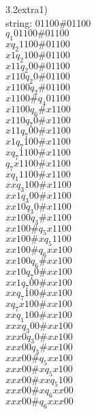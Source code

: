 \documentclass[11pt]{article}
\begin{document}
\noindent3.2extra1)\\
string: 01100\#01100\\
$q_1 0 1 1 0 0 \# 0 1 1 0 0$\\
$x q_2 1 1 0 0 \# 0 1 1 0 0$\\
$x 1 q_2 1 0 0 \# 0 1 1 0 0$\\
$x 1 1 q_2 0 0 \# 0 1 1 0 0$\\
$x 1 1 0 q_2 0 \# 0 1 1 0 0$\\
$x 1 1 0 0 q_2 \# 0 1 1 0 0$\\
$x 1 1 0 0 \# q_4 0 1 1 0 0$\\
$x 1 1 0 0 q_6 \# x 1 1 0 0$\\
$x 1 1 0 q_7 0 \# x 1 1 0 0$\\
$x 1 1 q_7 0 0 \# x 1 1 0 0$\\
$x 1 q_7 1 0 0 \# x 1 1 0 0$\\
$x q_7 1 1 0 0 \# x 1 1 0 0$\\
$q_7 x 1 1 0 0 \# x 1 1 0 0$\\
$x q_1 1 1 0 0 \# x 1 1 0 0$\\
$x x q_3 1 0 0 \# x 1 1 0 0$\\
$x x 1 q_3 0 0 \# x 1 1 0 0$\\
$x x 1 0 q_3 0 \# x 1 1 0 0$\\
$x x 1 0 0 q_3 \# x 1 1 0 0$\\
$x x 1 0 0 \# q_5 x 1 1 0 0$\\
$x x 1 0 0 \# x q_5 1 1 0 0$\\
$x x 1 0 0 \# q_6 x x 1 0 0$\\
$x x 1 0 0 q_6 \# x x 1 0 0$\\
$x x 1 0 q_7 0 \# x x 1 0 0$\\
$x x 1 q_7 0 0 \# x x 1 0 0$\\
$x x q_7 1 0 0 \# x x 1 0 0$\\
$x q_7 x 1 0 0 \# x x 1 0 0$\\
$x x q_1 1 0 0 \# x x 1 0 0$\\
$x x x q_3 0 0 \# x x 1 0 0$\\
$x x x 0 q_3 0 \# x x 1 0 0$\\
$x x x 0 0 q_3 \# x x 1 0 0$\\
$x x x 0 0 \# q_5 x x 1 0 0$\\
$x x x 0 0 \# x q_5 x 1 0 0$\\
$x x x 0 0 \# x x q_5 1 0 0$\\
$x x x 0 0 \# x q_6 x x 0 0$\\
$x x x 0 0 \# q_6 x x x 0 0$\\
\end{document}
